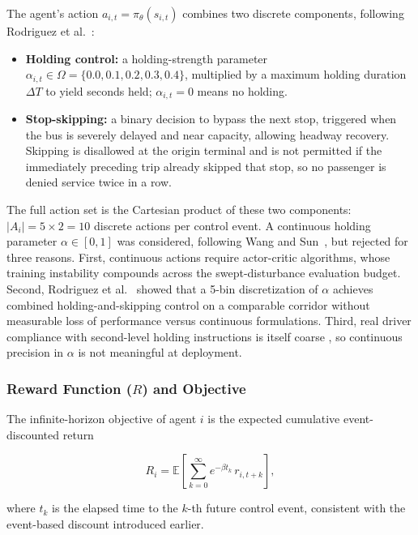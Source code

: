 The agent's action $a_{i,t} = \pi_\theta(s_{i,t})$ combines two discrete components, following Rodriguez et al.~\cite{Rodriguez2023Cooperative}:

\begin{itemize}
\item \textbf{Holding control:} a holding-strength parameter $\alpha_{i,t} \in \Omega = \{0.0, 0.1, 0.2, 0.3, 0.4\}$, multiplied by a maximum holding duration $\Delta T$ to yield seconds held; $\alpha_{i,t} = 0$ means no holding.
\item \textbf{Stop-skipping:} a binary decision to bypass the next stop, triggered when the bus is severely delayed and near capacity, allowing headway recovery. Skipping is disallowed at the origin terminal and is not permitted if the immediately preceding trip already skipped that stop, so no passenger is denied service twice in a row.
\end{itemize}

The full action set is the Cartesian product of these two components: $|A_i| = 5 \times 2 = 10$ discrete actions per control event. A continuous holding parameter $\alpha \in [0, 1]$ was considered, following Wang and Sun~\cite{Wangsun}, but rejected for three reasons. First, continuous actions require actor-critic algorithms, whose training instability compounds across the swept-disturbance evaluation budget. Second, Rodriguez et al.~\cite{Rodriguez2023Cooperative} showed that a 5-bin discretization of $\alpha$ achieves combined holding-and-skipping control on a comparable corridor without measurable loss of performance versus continuous formulations. Third, real driver compliance with second-level holding instructions is itself coarse \cite{Rodriguez2023Cooperative}, so continuous precision in $\alpha$ is not meaningful at deployment.
\clearpage
\subsubsection{Reward Function ($R$) and Objective}
\label{subsec:reward}

The infinite-horizon objective of agent $i$ is the expected cumulative event-discounted return

\begin{equation}
R_i = \mathbb{E}\!\left[\sum_{k=0}^{\infty} e^{-\beta t_k}\, r_{i, t+k}\right],
\end{equation}

where $t_k$ is the elapsed time to the $k$-th future control event, consistent with the event-based discount introduced earlier.

